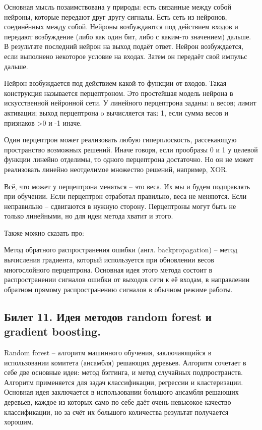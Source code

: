 \documentclass[a4paper, 12pt]{article}
\begin{document}
	Основная мысль позаимствована у природы: есть связанные между собой нейроны, которые передают друг другу сигналы.
	Есть сеть из нейронов, соединённых между собой.
	Нейроны возбуждаются под действием входов и передают возбуждение (либо как один бит, либо с каким-то значением) дальше.
	В результате последний нейрон на выход подаёт ответ. 
	Нейрон возбуждается, если выполнено некоторое условие на входах.
	Затем он передаёт свой импульс дальше.
	
	Нейрон возбуждается под действием какой-то функции от входов. Такая конструкция называется перцептроном. Это простейшая модель нейрона в искусственной нейронной сети.
	У линейного перцептрона заданы:
	n весов;
	лимит активации;
	выход перцептрона o вычисляется так:
	1, если сумма весов и признаков >0 и -1 иначе.
	
	Один перцептрон может реализовать любую гиперплоскость, рассекающую пространство возможных решений. Иначе говоря, если прообразы 0 и 1 у целевой функции линейно отделимы, то одного перцептрона достаточно.
	Но он не может реализовать линейно неотделимое множество решений, например, XOR.
	
	Всё, что может у перцептрона меняться -- это веса.
	Их мы и будем подправлять при обучении.
	Eсли перцептрон отработал правильно, веса не меняются. Если неправильно -- сдвигаются в нужную сторону. Перцептроны могут быть не только линейными, но для идеи метода хватит и этого.
	
	Также можно сказать про:
	
	Метод обратного распространения ошибки (англ. backpropagation) -- метод вычисления градиента, который используется при обновлении весов многослойного перцептрона. Основная идея этого метода состоит в распространении сигналов ошибки от выходов сети к её входам, в направлении обратном прямому распространению сигналов в обычном режиме работы.
	
	\subsection*{Билет 11.  Идея методов random forest и gradient boosting.}
	Random forest -- алгоритм машинного обучения, заключающийся в использовании комитета (ансамбля) решающих деревьев. Алгоритм сочетает в себе две основные идеи: метод бэггинга, и метод случайных подпространств. Алгоритм применяется для задач классификации, регрессии и кластеризации. Основная идея заключается в использовании большого ансамбля решающих деревьев, каждое из которых само по себе даёт очень невысокое качество классификации, но за счёт их большого количества результат получается хорошим.
	
\end{document}
